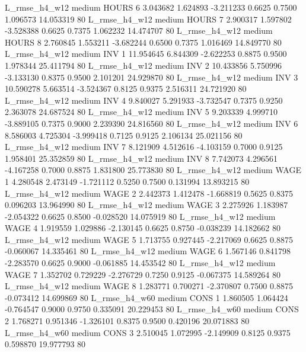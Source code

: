  L_rmse_h4_w12     medium    HOURS                 6  3.043682 1.624893 -3.211233 0.6625 0.7500  1.096573   14.053319 80
 L_rmse_h4_w12     medium    HOURS                 7  2.900317 1.597802 -3.528388 0.6625 0.7375  1.062232   14.474707 80
 L_rmse_h4_w12     medium    HOURS                 8  2.760845 1.553211 -3.682244 0.6500 0.7375  1.016469   14.849770 80
 L_rmse_h4_w12     medium      INV                 1 11.954645 6.844309 -2.622253 0.8875 0.9500  1.978344   25.411794 80
 L_rmse_h4_w12     medium      INV                 2 10.433856 5.750996 -3.133130 0.8375 0.9500  2.101201   24.929870 80
 L_rmse_h4_w12     medium      INV                 3 10.590278 5.663514 -3.524367 0.8125 0.9375  2.516311   24.721920 80
 L_rmse_h4_w12     medium      INV                 4  9.840027 5.291933 -3.732547 0.7375 0.9250  2.363078   24.687524 80
 L_rmse_h4_w12     medium      INV                 5  9.203339 4.999710 -3.889105 0.7375 0.9000  2.239390   24.816560 80
 L_rmse_h4_w12     medium      INV                 6  8.586003 4.725304 -3.999418 0.7125 0.9125  2.106134   25.021156 80
 L_rmse_h4_w12     medium      INV                 7  8.121909 4.512616 -4.103159 0.7000 0.9125  1.958401   25.352859 80
 L_rmse_h4_w12     medium      INV                 8  7.742073 4.296561 -4.167258 0.7000 0.8875  1.831800   25.773830 80
 L_rmse_h4_w12     medium     WAGE                 1  4.280548 2.473149 -1.721112 0.5250 0.7500  0.131994   13.893215 80
 L_rmse_h4_w12     medium     WAGE                 2  2.442373 1.412478 -1.668819 0.5625 0.8375  0.096203   13.964990 80
 L_rmse_h4_w12     medium     WAGE                 3  2.275926 1.183987 -2.054322 0.6625 0.8500 -0.028520   14.075919 80
 L_rmse_h4_w12     medium     WAGE                 4  1.919559 1.029886 -2.130145 0.6625 0.8750 -0.038239   14.182662 80
 L_rmse_h4_w12     medium     WAGE                 5  1.713755 0.927445 -2.217069 0.6625 0.8875 -0.060067   14.335461 80
 L_rmse_h4_w12     medium     WAGE                 6  1.567146 0.841798 -2.283570 0.6625 0.9000 -0.061885   14.453542 80
 L_rmse_h4_w12     medium     WAGE                 7  1.352702 0.729229 -2.276729 0.7250 0.9125 -0.067375   14.589264 80
 L_rmse_h4_w12     medium     WAGE                 8  1.283771 0.700271 -2.370807 0.7500 0.8875 -0.073412   14.699869 80
 L_rmse_h4_w60     medium     CONS                 1  1.860505 1.064424 -0.764547 0.9000 0.9750  0.335091   20.229453 80
 L_rmse_h4_w60     medium     CONS                 2  1.768271 0.951346 -1.326101 0.8375 0.9500  0.420196   20.071883 80
 L_rmse_h4_w60     medium     CONS                 3  2.510045 1.072995 -2.149909 0.8125 0.9375  0.598870   19.977793 80
